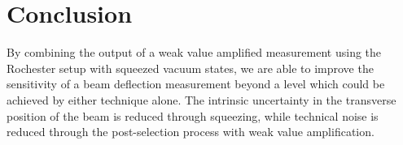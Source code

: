 %
%
%
\section{Conclusion}
By combining the output of a weak value amplified measurement using the Rochester setup with squeezed vacuum states, we are able to improve the sensitivity of a beam deflection measurement beyond a level which could be achieved by either technique alone.  The intrinsic uncertainty in the transverse position of the beam is reduced through squeezing, while technical noise is reduced through the post-selection process with weak value amplification.

